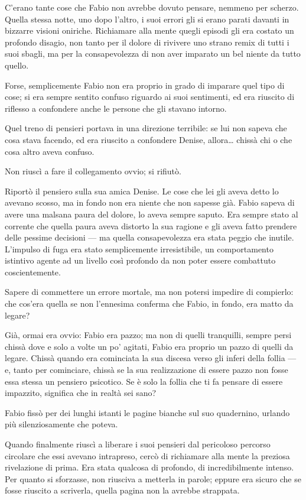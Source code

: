 C'erano tante cose che Fabio non avrebbe dovuto pensare, nemmeno per scherzo. Quella stessa notte, uno dopo l'altro, i suoi errori gli si erano parati davanti in bizzarre visioni oniriche. Richiamare alla mente quegli episodi gli era costato un profondo disagio, non tanto per il dolore di rivivere uno strano remix di tutti i suoi sbagli, ma per la consapevolezza di non aver imparato un bel niente da tutto quello. 

Forse, semplicemente Fabio non era proprio in grado di imparare quel tipo di cose; si era sempre sentito confuso riguardo ai suoi sentimenti, ed era riuscito di riflesso a confondere anche le persone che gli stavano intorno.

Quel treno di pensieri portava in una direzione terribile: se lui non sapeva che cosa stava facendo, ed era riuscito a confondere Denise, allora\ldots{} chissà chi o che cosa altro aveva confuso.

Non riuscì a fare il collegamento ovvio; si rifiutò.

Riportò il pensiero sulla sua amica Denise. Le cose che lei gli aveva detto lo avevano scosso, ma in fondo non era niente che non sapesse già. Fabio sapeva di avere una malsana paura del dolore, lo aveva sempre saputo. Era sempre stato al corrente che quella paura aveva distorto la sua ragione e gli aveva fatto prendere delle pessime decisioni --- ma quella consapevolezza era stata peggio che inutile. L'impulso di fuga era stato semplicemente irresistibile, un comportamento istintivo agente ad un livello così profondo da non poter essere combattuto coscientemente.

Sapere di commettere un errore mortale, ma non potersi impedire di compierlo: che cos'era quella se non l'ennesima conferma che Fabio, in fondo, era matto da legare?

Già, ormai era ovvio: Fabio era pazzo; ma non di quelli tranquilli, sempre persi chissà dove e solo a volte un po' agitati, Fabio era proprio un pazzo di quelli da legare. Chissà quando era cominciata la sua discesa verso gli inferi della follia --- e, tanto per cominciare, chissà se la sua realizzazione di essere pazzo non fosse essa stessa un pensiero psicotico. Se è solo la follia che ti fa pensare di essere impazzito, significa che in realtà sei sano?

Fabio fissò per dei lunghi istanti le pagine bianche sul suo quadernino, urlando più silenziosamente che poteva.

Quando finalmente riuscì a liberare i suoi pensieri dal pericoloso percorso circolare che essi avevano intrapreso, cercò di richiamare alla mente la preziosa rivelazione di prima. Era stata qualcosa di profondo, di incredibilmente intenso. Per quanto si sforzasse, non riusciva a metterla in parole; eppure era sicuro che se fosse riuscito a scriverla, quella pagina non la avrebbe strappata.

